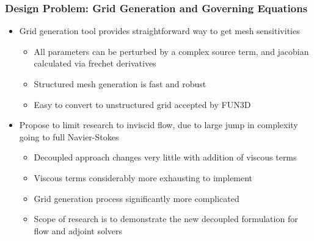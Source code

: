 \documentclass{beamer}
\begin{document}
\begin{frame}
  \frametitle{Design Problem: Grid Generation and Governing Equations}
  \begin{itemize}
    \item Grid generation tool provides straightforward way to get mesh
      sensitivities
      \begin{itemize}
        \item All parameters can be perturbed by a complex source term, and
          jacobian calculated via frechet derivatives
        \item Structured mesh generation is fast and robust
        \item Easy to convert to unstructured grid accepted by FUN3D
      \end{itemize}
    \item Propose to limit research to inviscid flow, due to large jump in
      complexity going to full Navier-Stokes
      \begin{itemize}
        \item Decoupled approach changes very little with addition of viscous
          terms
        \item Viscous terms considerably more exhausting to implement
        \item Grid generation process significantly more complicated
        \item Scope of research is to demonstrate the new decoupled formulation
          for flow and adjoint solvers
      \end{itemize}
  \end{itemize}
  
\end{frame}
\end{document}

